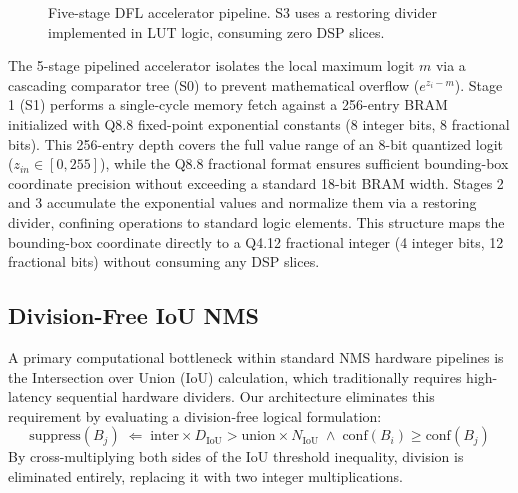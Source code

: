 \documentclass{svproc}
\begin{document}
\begin{figure}[H]
{
}
\caption{Five-stage DFL accelerator pipeline. S3 uses a restoring divider implemented in LUT logic, consuming zero DSP slices.}
\label{fig:dfl_pipeline}
\end{figure}

The 5-stage pipelined accelerator isolates the local maximum logit $m$ via a cascading comparator tree (S0) to prevent mathematical overflow ($e^{z_i - m}$). Stage 1 (S1) performs a single-cycle memory fetch against a 256-entry BRAM initialized with Q8.8 fixed-point exponential constants (8 integer bits, 8 fractional bits). This 256-entry depth covers the full value range of an 8-bit quantized logit ($z_{in} \in [0, 255]$), while the Q8.8 fractional format ensures sufficient bounding-box coordinate precision without exceeding a standard 18-bit BRAM width. Stages 2 and 3 accumulate the exponential values and normalize them via a restoring divider, confining operations to standard logic elements. This structure maps the bounding-box coordinate directly to a Q4.12 fractional integer (4 integer bits, 12 fractional bits) without consuming any DSP slices.
\subsection{Division-Free IoU NMS}
A primary computational bottleneck within standard NMS hardware pipelines is the Intersection over Union (IoU) calculation, which traditionally requires high-latency sequential hardware dividers. Our architecture eliminates this requirement by evaluating a division-free logical formulation:
\begin{equation}
    \text{suppress}(B_j) \;\Leftarrow\; \text{inter} \times D_{\text{IoU}} > \text{union} \times N_{\text{IoU}} \;\wedge\; \text{conf}(B_i) \geq \text{conf}(B_j)
\end{equation}
By cross-multiplying both sides of the IoU threshold inequality, division is eliminated entirely, replacing it with two integer multiplications.
\end{document}
